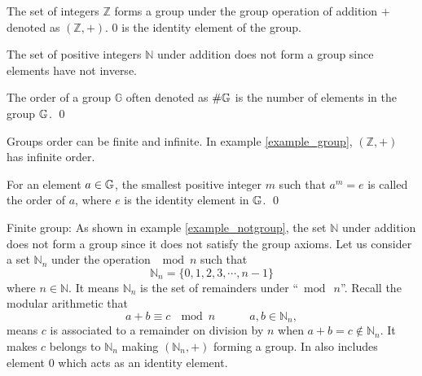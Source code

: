 \begin{example} \label{example_group}
 The set of integers $\mathbb{Z}$ forms a group under the group operation of addition $+$ denoted as $(\mathbb{Z},+)$. $0$ is the identity element of the group.
\end{example}
\begin{example}\label{example_notgroup}
	 The set of positive integers $\mathbb{N}$ under addition does not form a group since elements have not inverse.
\end{example}
\begin{definition}\hspace{0em}
The order of a group $\mathbb{G}$  often denoted as $\#\mathbb{G}\index{group}$ is the number of elements in the group $\mathbb{G}\index{group}$.
\qed
\end{definition}

\begin{remark}
	 Groups order can be finite and infinite. In example \ref{example_group}, $(\mathbb{Z},+)$ has infinite order.
\end{remark}

\begin{definition}
	For an element $a\in\mathbb{G}\index{group}$, the smallest positive integer $m$ such that $a^{m}=e$ is called the order of $a$, where $e$ is the identity element in $\mathbb{G}\index{group}$.
	\qed
\end{definition}

\begin{example}{Finite group:   } \label{definition_finite_group}
As shown in example \ref{example_notgroup}, the set $\mathbb{N}$ under addition does not form a group 
since it does not satisfy the group axioms. 
Let us consider a set $\mathbb{N}_{n}$ under the operation $\mod n$  such that 
$$ \mathbb{N}_{n} = \{0,1,2,3, \cdots, n-1\}$$
where $n \in \mathbb{N}$.
It means $\mathbb{N}_{n}$ is the set of remainders under ``$\bmod\ n$''.
Recall the modular arithmetic that 
$$a+b\equiv c\ \ \bmod n\hspace{3em}a,b\in \mathbb{N}_{n},\label{Sum Definition}$$
 means $c$ is  associated to a remainder on division by $n$ when $a+b=c\notin\mathbb{N}_{n}$. 
It makes $c$ belongs to $\mathbb{N}_{n}$ making $( \mathbb{N}_{n},+)$ forming a group.
In also includes element $0$ which acts as an identity element.
\end{example}

